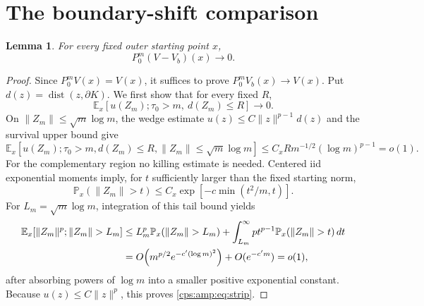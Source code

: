 \documentclass[11pt,letterpaper]{article}
\numberwithin{equation}{section}
\newtheorem{lemma}[theorem]{Lemma}
\theoremstyle{remark}\newtheorem{remark}[theorem]{Remark}
\newcommand{\PP}{\mathbb P}
\newcommand{\EE}{\mathbb E}
\newcommand{\norm}[1]{\lVert#1\rVert}
\begin{document}
\section{The boundary-shift comparison}\label{cps:amp:sec:shift}
\begin{lemma}\label{cps:amp:lem:shift}
For every fixed outer starting point $x$,
\begin{equation}\label{cps:amp:eq:shiftlimit}
 P_0^m(V-V_b)(x)\longrightarrow0.
\end{equation}
\end{lemma}
\begin{proof}
Since $P_0^mV(x)=V(x)$, it suffices to prove $P_0^mV_b(x)\to V(x)$. Put $d(z)=\operatorname{dist}(z,\partial K)$. We first show that for every fixed $R$,
\begin{equation}\label{cps:amp:eq:strip}
 \EE_x[u(Z_m);\tau_0>m,\ d(Z_m)\le R]\longrightarrow0.
\end{equation}
On $\norm{Z_m}\le\sqrt m\log m$, the wedge estimate
$u(z)\le C\norm z^{p-1}d(z)$ and the survival upper bound give
\begin{equation}
 \EE_x[u(Z_m);\tau_0>m,d(Z_m)\le R,\norm{Z_m}\le\sqrt m\log m]
 \le C_xR m^{-1/2}(\log m)^{p-1}=o(1).
\end{equation}
For the complementary region no killing estimate is needed. Centered iid exponential moments imply, for $t$ sufficiently larger than the fixed starting norm,
\begin{equation}\label{cps:amp:eq:tail}
 \PP_x(\norm{Z_m}>t)\le C_x\exp[-c\min(t^2/m,t)].
\end{equation}
For $L_m=\sqrt m\log m$, integration of this tail bound yields
\begin{align}
 \EE_x[\norm{Z_m}^p;\norm{Z_m}>L_m]
 &\le L_m^p\PP_x(\norm{Z_m}>L_m)
   +\int_{L_m}^{\infty}pt^{p-1}\PP_x(\norm{Z_m}>t)\,dt\notag\\
 &=O\!\left(m^{p/2}e^{-c'(\log m)^2}\right)+O(e^{-c'm})=o(1),\label{cps:amp:eq:tailmoment}
\end{align}
after absorbing powers of $\log m$ into a smaller positive exponential constant. Because $u(z)\le C\norm z^p$, this proves \eqref{cps:amp:eq:strip}.


\end{proof}
\end{document}
